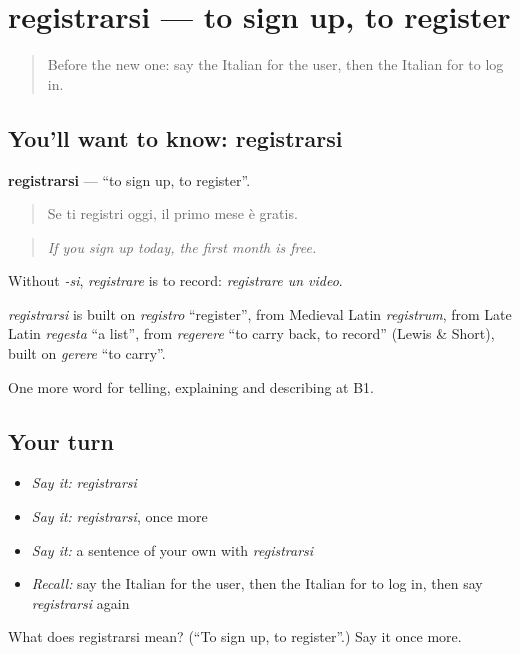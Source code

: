 \section[registrarsi]{registrarsi — to sign up, to register}

\label{lesson:IT-C399-registrarsi}



\begin{quote}
Before the new one: say the Italian for the user, then the Italian for to log in.
\end{quote}

\subsection*{You'll want to know: registrarsi}
\textbf{registrarsi} — \textquotedblleft{}to sign up, to register\textquotedblright{}.

\begin{quote}
Se ti registri oggi, il primo mese è gratis.
\end{quote}

\begin{quote}
\emph{If you sign up today, the first month is free.}
\end{quote}

Without \emph{-si}, \emph{registrare} is to record: \emph{registrare un video}.

\begin{cousinweb}
\emph{registrarsi} is built on \emph{registro} \textquotedblleft{}register\textquotedblright{}, from Medieval Latin \emph{registrum}, from Late Latin \emph{regesta} \textquotedblleft{}a list\textquotedblright{}, from \emph{regerere} \textquotedblleft{}to carry back, to record\textquotedblright{} (Lewis \& Short), built on \emph{gerere} \textquotedblleft{}to carry\textquotedblright{}.
\end{cousinweb}

\begin{grammarlens}[title={What you've built}]
One more word for telling, explaining and describing at B1.
\end{grammarlens}

\subsection*{Your turn}
\begin{itemize}
\raggedright
  \item \emph{Say it:} \emph{registrarsi}
  \item \emph{Say it:} \emph{registrarsi}, once more
  \item \emph{Say it:} a sentence of your own with \emph{registrarsi}
  \item \emph{Recall:} say the Italian for the user, then the Italian for to log in, then say \emph{registrarsi} again
\end{itemize}

\begin{tcolorbox}[breakable,colback=teal!4,colframe=teal!35!black,title={Before you move on}]
What does registrarsi mean? (\textquotedblleft{}To sign up, to register\textquotedblright{}.) Say it once more.
\end{tcolorbox}
